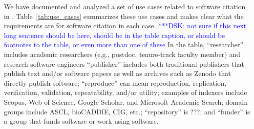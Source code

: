 \documentclass[11pt, oneside]{amsart}
\newcommand{\katznote}[1]{ {\textcolor{blue} { ***DSK: #1 }}}
\begin{document}
We have documented and analyzed a set of use cases related to software citation in \cite{SC-Use-Cases}.  Table~\ref{tab:use_cases} summarizes these use cases and makes clear what the requirements are for software citation in each case.  \katznote{not sure if this next long sentence should be here, should be in the table caption, or should be footnotes to the table, or even more than one of these} In the table, 
``researcher'' includes academic researchers (e.g., postdoc, tenure-track faculty member) and research software engineers
``publisher'' includes both traditional publishers that publish text and\slash or software papers as well as archives such as Zenodo that directly publish software; ``reproduce'' can mean reproduction, replication, verification, validation, repeatability, and\slash or utility; 
examples of indexers include Scopus, Web of Science, Google Scholar, and Microsoft Academic Search;  
domain groups include ASCL, bioCADDIE, CIG, etc.;
``repository'' is ???; and
``funder'' is a group that funds software or work using software.
\end{document}
